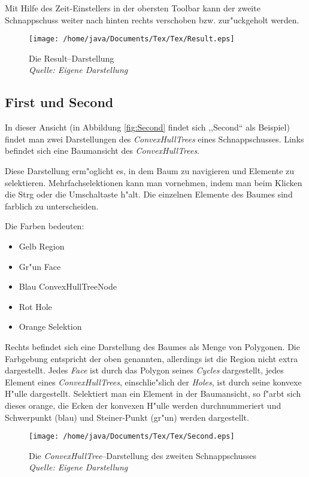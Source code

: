 Mit Hilfe des Zeit-Einstellers in der obersten Toolbar kann der zweite Schnappschuss weiter nach hinten rechts verschoben bzw. zur"uckgeholt werden. 

\begin{figure}
   \centering
   \texttt{[image: /home/java/Documents/Tex/Tex/Result.eps]}
   \caption[Result--Darstellung]{Die Result--Darstellung\\\textit{Quelle: Eigene Darstellung}}
   \label{fig:Result}
\end{figure}
\subsection{First und Second}
In dieser Ansicht (in Abbildung \vref{fig:Second} findet sich ,,Second`` als Beispiel) findet man zwei Darstellungen des \textit{ConvexHullTrees} eines Schnappschusses. Links befindet sich eine Baum\-ansicht des \textit{ConvexHullTrees}.

Diese Darstellung erm"oglicht es, in dem Baum zu navigieren und Elemente zu selektieren. Mehrfachselektionen kann man vornehmen, indem man beim Klicken die Strg oder die Umschaltaste h"alt. Die einzelnen Elemente des Baumes sind farblich zu unterscheiden.

Die Farben bedeuten:
\begin{itemize}
\item Gelb Region
\item Gr"un Face
\item Blau ConvexHullTreeNode
\item Rot Hole
\item Orange Selektion
\end{itemize} 

Rechts befindet sich eine Darstellung des Baumes als Menge von Polygonen. Die Farbgebung entspricht der oben genannten, allerdings ist die Region nicht extra dargestellt. Jedes \textit{Face} ist durch das Polygon seines \textit{Cycles} dargestellt, jedes Element eines \textit{ConvexHullTrees}, einschlie"slich der \textit{Holes}, ist durch seine konvexe H"ulle dargestellt. Selektiert man ein Element in der Baumansicht, so f"arbt sich dieses orange, die Ecken der konvexen H"ulle werden durchnummeriert und Schwerpunkt (blau) und Steiner-Punkt (gr"un) werden dargestellt.

\begin{figure}
   \centering
   \texttt{[image: /home/java/Documents/Tex/Tex/Second.eps]}
   \caption[ConvexHullTree--Darstellung]{Die \textit{ConvexHullTree}--Darstellung des zweiten Schnappschusses\\\textit{Quelle: Eigene Darstellung}}
   \label{fig:Second}
\end{figure}
